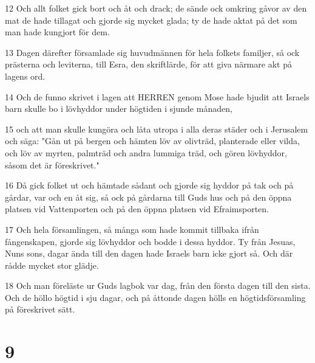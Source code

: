 \par 12 Och allt folket gick bort och åt och drack; de sände ock omkring gåvor av den mat de hade tillagat och gjorde sig mycket glada; ty de hade aktat på det som man hade kungjort för dem.
\par 13 Dagen därefter församlade sig huvudmännen för hela folkets familjer, så ock prästerna och leviterna, till Esra, den skriftlärde, för att giva närmare akt på lagens ord.
\par 14 Och de funno skrivet i lagen att HERREN genom Mose hade bjudit att Israels barn skulle bo i lövhyddor under högtiden i sjunde månaden,
\par 15 och att man skulle kungöra och låta utropa i alla deras städer och i Jerusalem och säga: "Gån ut på bergen och hämten löv av olivträd, planterade eller vilda, och löv av myrten, palmträd och andra lummiga träd, och gören lövhyddor, såsom det är föreskrivet."
\par 16 Då gick folket ut och hämtade sådant och gjorde sig hyddor på tak och på gårdar, var och en åt sig, så ock på gårdarna till Guds hus och på den öppna platsen vid Vattenporten och på den öppna platsen vid Efraimsporten.
\par 17 Och hela församlingen, så många som hade kommit tillbaka ifrån fångenskapen, gjorde sig lövhyddor och bodde i dessa hyddor. Ty från Jesuas, Nuns sons, dagar ända till den dagen hade Israels barn icke gjort så. Och där rådde mycket stor glädje.
\par 18 Och man föreläste ur Guds lagbok var dag, från den första dagen till den sista. Och de höllo högtid i sju dagar, och på åttonde dagen hölls en högtidsförsamling på föreskrivet sätt.

\chapter{9}


